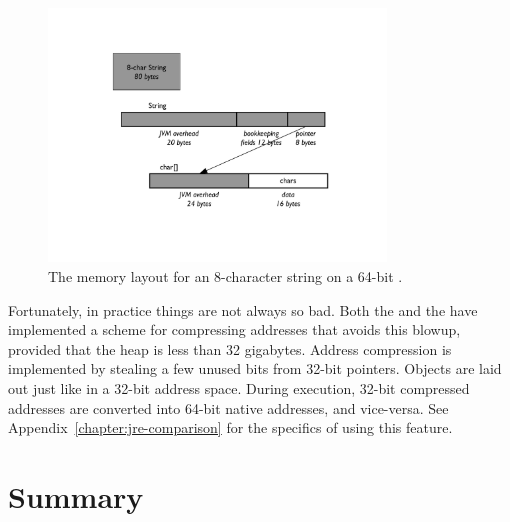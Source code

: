  \begin{figure}
  \centering

 \includegraphics[width=0.8\textwidth]{part1/Figures/modelingdatatypes/8-char-string-64-bit.pdf}
  \caption{The memory layout for an 8-character string on a 64-bit \jre.}
  \label{fig:8-char-string-64-bit}
\end{figure}

Fortunately, in practice things are not always so bad. Both the \oracle and the
\ibm \jres have implemented a scheme for compressing addresses that avoids this blowup, provided that the heap is
less than 32 gigabytes. Address compression is implemented by stealing a few unused bits from 32-bit pointers.
Objects are laid out just like in a 32-bit
address space. During execution, 32-bit compressed addresses are converted into
64-bit native addresses, and vice-versa.  See Appendix~\ref{chapter:jre-comparison} for the
specifics of using this feature.


\section{Summary}

